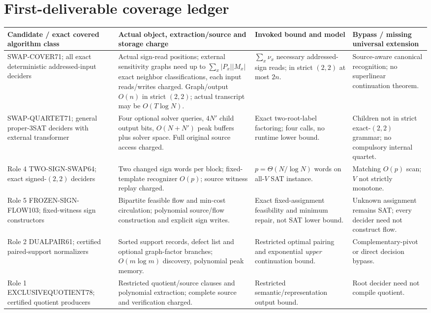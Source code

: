 \documentclass[11pt]{article}
\begin{document}
\section{First-deliverable coverage ledger}
\small
\begin{longtable}{@{}p{.18\linewidth}p{.27\linewidth}p{.23\linewidth}p{.25\linewidth}@{}}
\toprule Candidate / exact covered algorithm class & Actual object, extraction/source and storage charge & Invoked bound and model & Bypass / missing universal extension\\\midrule\endhead
SWAP-COVER71; all exact deterministic addressed-input deciders & Actual sign-read positions; external sensitivity graphs need up to $\sum_x|P_x||M_x|$ exact neighbor classifications, each input reads/writes charged. Graph/output $O(n)$ in strict $(2,2)$; actual transcript may be $O(T\log N)$. & $\sum_x\nu_x$ necessary addressed-sign reads; in strict $(2,2)$ at most $2n$. & Source-aware canonical recognition; no superlinear continuation theorem.\\
SWAP-QUARTET71; general proper-3SAT deciders with external transformer & Four optional solver queries, $4N'$ child output bits, $O(N+N')$ peak buffers plus solver space. Full original source access charged. & Exact two-root-label factoring; four calls, no runtime lower bound. & Children not in strict exact-$(2,2)$ grammar; no compulsory internal quartet.\\
Role 4 TWO-SIGN-SWAP64; exact signed-$(2,2)$ deciders & Two changed sign words per block; fixed-template recognizer $O(p)$; source witness replay charged. & $p=\Theta(N/\log N)$ words on all-$V$ SAT instance. & Matching $O(p)$ scan; $V$ not strictly monotone.\\
Role 5 FROZEN-SIGN-FLOW103; fixed-witness sign constructors & Bipartite feasible flow and min-cost circulation; polynomial source/flow construction and explicit sign writes. & Exact fixed-assignment feasibility and minimum repair, not SAT lower bound. & Unknown assignment remains SAT; every decider need not construct flow.\\
Role 2 DUALPAIR61; certified paired-support normalizers & Sorted support records, defect list and optional graph-factor branches; $O(m\log m)$ discovery, polynomial peak memory. & Restricted optimal pairing and exponential \emph{upper} continuation bound. & Complementary-pivot or direct decision bypass.\\
Role 1 EXCLUSIVEQUOTIENT78; certified quotient producers & Restricted quotient/source clauses and polynomial extraction; complete source and verification charged. & Restricted semantic/representation output bound. & Root decider need not compile quotient.\\

\end{longtable}
\end{document}
